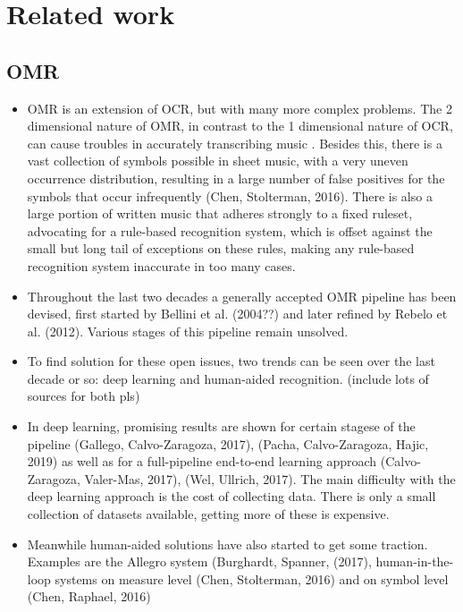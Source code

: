 \chapter{Related work}\label{chap:related-work}

\section{OMR}\label{sec:related-work-OMR}
\begin{itemize}
    \item OMR is an extension of OCR, but with many more complex problems. The 2 dimensional nature of OMR, in contrast to the 1 dimensional nature of OCR, can cause troubles in accurately transcribing music \citeneeded. Besides this, there is a vast collection of symbols possible in sheet music, with a very uneven occurrence distribution, resulting in a large number of false positives for the symbols that occur infrequently (Chen, Stolterman, 2016). There is also a large portion of written music that adheres strongly to a fixed ruleset, advocating for a rule-based recognition system, which is offset against the small but long tail of exceptions on these rules, making any rule-based recognition system inaccurate in too many cases.
    \item Throughout the last two decades a generally accepted OMR pipeline has been devised, first started by Bellini et al. (2004??) and later refined by Rebelo et al. (2012). Various stages of this pipeline remain unsolved.
    \item To find solution for these open issues, two trends can be seen over the last decade or so: deep learning and human-aided recognition. (include lots of sources for both pls)
    \item In deep learning, promising results are shown for certain stagese of the pipeline (Gallego, Calvo-Zaragoza, 2017), (Pacha, Calvo-Zaragoza, Hajic, 2019) as well as for a full-pipeline end-to-end learning approach (Calvo-Zaragoza, Valer-Mas, 2017), (Wel, Ullrich, 2017). The main difficulty with the deep learning approach is the cost of collecting data. There is only a small collection of datasets available, getting more of these is expensive.
    \item Meanwhile human-aided solutions have also started to get some traction. Examples are the Allegro system (Burghardt, Spanner, (2017), human-in-the-loop systems on measure level (Chen, Stolterman, 2016) and on symbol level (Chen, Raphael, 2016)
\end{itemize}

